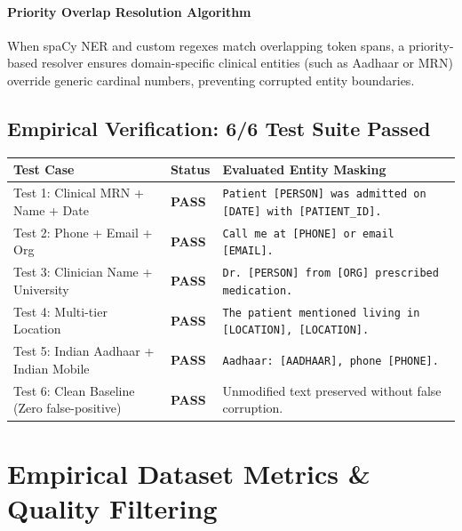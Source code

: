 \documentclass[11pt,a4paper]{article}
\begin{document}
\paragraph{Priority Overlap Resolution Algorithm}
When spaCy NER and custom regexes match overlapping token spans, a priority-based resolver ensures domain-specific clinical entities (such as Aadhaar or MRN) override generic cardinal numbers, preventing corrupted entity boundaries.

\subsection{Empirical Verification: 6/6 Test Suite Passed}
\begin{tcolorbox}[clinicalBox={PII Scrubber Verification Results (100\% Pass Rate)}]
\small\sffamily
\begin{tabularx}{\linewidth}{llX}
\toprule
\textbf{Test Case} & \textbf{Status} & \textbf{Evaluated Entity Masking} \\
\midrule
Test 1: Clinical MRN + Name + Date & \textcolor{successgreen}{\textbf{PASS}} & \texttt{Patient [PERSON] was admitted on [DATE] with [PATIENT\_ID].} \\
Test 2: Phone + Email + Org & \textcolor{successgreen}{\textbf{PASS}} & \texttt{Call me at [PHONE] or email [EMAIL].} \\
Test 3: Clinician Name + University & \textcolor{successgreen}{\textbf{PASS}} & \texttt{Dr. [PERSON] from [ORG] prescribed medication.} \\
Test 4: Multi-tier Location & \textcolor{successgreen}{\textbf{PASS}} & \texttt{The patient mentioned living in [LOCATION], [LOCATION].} \\
Test 5: Indian Aadhaar + Indian Mobile & \textcolor{successgreen}{\textbf{PASS}} & \texttt{Aadhaar: [AADHAAR], phone [PHONE].} \\
Test 6: Clean Baseline (Zero false-positive) & \textcolor{successgreen}{\textbf{PASS}} & Unmodified text preserved without false corruption. \\
\bottomrule
\end{tabularx}
\end{tcolorbox}

\section{Empirical Dataset Metrics \& Quality Filtering}
\end{document}

